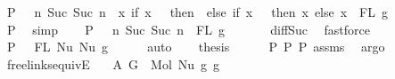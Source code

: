\begin{isabellebody}
\ P{}{\isacharcolon}{\kern0pt}\ {\isachardoublequoteopen}{\isachardot}{\kern0pt}{\isachardot}{\kern0pt}{\isachardot}{\kern0pt}\ {\isacharequal}{\kern0pt}\ {\isacharbraceleft}{\kern0pt}n{\isachardot}{\kern0pt}\ Suc\ {\isacharparenleft}{\kern0pt}Suc\ n{\isacharparenright}{\kern0pt}\ {\isasymin}\ {\isacharparenleft}{\kern0pt}{\isasymlambda}x{\isachardot}{\kern0pt}\ if\ x\ {\isacharequal}{\kern0pt}\ {}\ then\ {}\ else\ if\ x\ {\isacharequal}{\kern0pt}\ {}\ then\ x\ else\ x{\isacharparenright}{\kern0pt}\ {\isacharbackquote}{\kern0pt}\ FL\ g{\isacharbraceright}{\kern0pt}{\isachardoublequoteclose}\isanewline
\ \ \ \ \ \ \isamarkupfalse%
\ P{}\ \isamarkupfalse%
\ simp\isanewline
\ \ \isamarkupfalse%
\ P{}{\isacharcolon}{\kern0pt}\ {\isachardoublequoteopen}{\isachardot}{\kern0pt}{\isachardot}{\kern0pt}{\isachardot}{\kern0pt}\ {\isacharequal}{\kern0pt}\ {\isacharbraceleft}{\kern0pt}n{\isachardot}{\kern0pt}\ Suc\ {\isacharparenleft}{\kern0pt}Suc\ n{\isacharparenright}{\kern0pt}\ {\isasymin}\ FL\ g{\isacharbraceright}{\kern0pt}{\isachardoublequoteclose}\isanewline
\ \ \ \ \ \isamarkupfalse%
\ diff{\isacharunderscore}{\kern0pt}Suc{\isacharunderscore}{\kern0pt}{}{\isacharprime}{\kern0pt}\ \isamarkupfalse%
\ fastforce\isanewline
\ \ \isamarkupfalse%
\ P{}{\isacharcolon}{\kern0pt}\ {\isachardoublequoteopen}{\isachardot}{\kern0pt}{\isachardot}{\kern0pt}{\isachardot}{\kern0pt}\ {\isacharequal}{\kern0pt}\ FL\ {\isacharparenleft}{\kern0pt}Nu\ {\isacharparenleft}{\kern0pt}Nu\ g{\isacharparenright}{\kern0pt}{\isacharparenright}{\kern0pt}{\isachardoublequoteclose}\isanewline
\ \ \ \ \isamarkupfalse%
\ auto\isanewline
\ \ \isamarkupfalse%
\ {\isacharquery}{\kern0pt}thesis\isanewline
\ \ \ \ \isamarkupfalse%
\ P{}\ P{}\ P{}\ assms{\isacharparenleft}{\kern0pt}{}{\isacharcomma}{\kern0pt}{}{\isacharparenright}{\kern0pt}\ \isamarkupfalse%
\ argo\isanewline
{}\isamarkupfalse%
%
\endisatagproof
{\isafoldproof}%
%
\isadelimproof
\isanewline
%
\endisadelimproof
\isanewline
\isanewline
\isanewline
{}\isamarkupfalse%
\ freelinks{\isacharunderscore}{\kern0pt}equiv{\isacharunderscore}{\kern0pt}E{}{}{\isacharcolon}{\kern0pt}\isanewline
\ \ \ A{}{\isacharcolon}{\kern0pt}\ {\isachardoublequoteopen}G{}\ {\isacharequal}{\kern0pt}\ Mol\ {\isacharparenleft}{\kern0pt}Nu\ g{}{\isacharparenright}{\kern0pt}\ g{}{\isachardoublequoteclose}\isanewline

\end{isabellebody}
